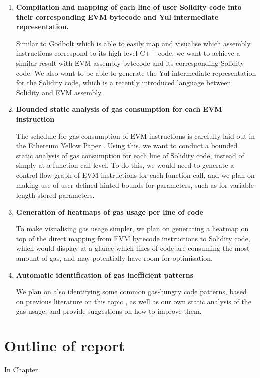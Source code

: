 \begin{enumerate}
    \item \textbf{Compilation and mapping of each line of user Solidity code into their corresponding EVM bytecode and Yul intermediate representation.}
    
      Similar to Godbolt which is able to easily map and visualise which assembly
      instructions correspond to its high-level C++ code, we want to achieve a
      similar result with EVM assembly bytecode and its corresponding Solidity code.
      We also want to be able to generate the Yul intermediate representation for
      the Solidity code, which is a recently introduced language between Solidity
      and EVM assembly.
    \item \textbf{Bounded static analysis of gas consumption for each EVM instruction}
    
      The schedule for gas consumption of EVM instructions is carefully laid out 
      in the Ethereum Yellow Paper \cite{ethereumyellowpaper}. Using this,
      we want to conduct a bounded static analysis of gas consumption for each line
      of Solidity code, instead of simply at a function call level. To do this, we would
      need to generate a control flow graph of EVM instructions for each function call, and we plan on making use
      of user-defined hinted bounds for parameters, such as for variable length stored parameters.

    \item \textbf{Generation of heatmaps of gas usage per line of code}
    
      To make visualising gas usage simpler, we plan on generating a heatmap on top of
      the direct mapping from EVM bytecode instructions to Solidity code, which would 
      display at a glance which lines of code are consuming the most amount of gas, and 
      may potentially have room for optimisation.

    \item \textbf{Automatic identification of gas inefficient patterns}
      
      We plan on also identifying some common gas-hungry code patterns, 
      based on previous literature on this topic \cite{gaschecker} \cite{designpatternsforgasoptimisation} \cite{underoptimisedcontractsdevour}, as well as our 
      own static analysis of the gas usage, and provide suggestions on how 
      to improve them.
      
\end{enumerate}


\section{Outline of report}

In Chapter 